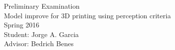 \documentclass[letterpaper,11pt,oneside]{article}
\begin{document}
\setlength{\parindent}{0cm}
\setlength{\headsep}{25pt}
\setlength{\footskip}{15pt}
\begin{center}
{\Large Preliminary Examination}\\
{\Large Model improve for 3D printing using perception criteria} \\
{\large Spring 2016} \\
{\small Student: Jorge A. Garcia} \\
{\small Advisor: Bedrich Benes}
\end{center}


\cleardoublepage
\singlespacing


\end{document}
